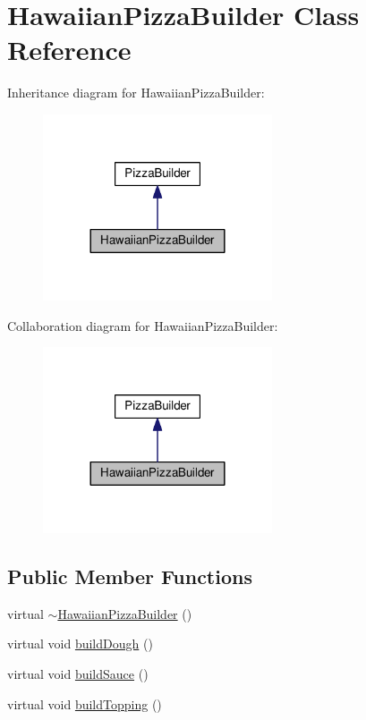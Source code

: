 \hypertarget{classHawaiianPizzaBuilder}{}\section{Hawaiian\+Pizza\+Builder Class Reference}
\label{classHawaiianPizzaBuilder}


Inheritance diagram for Hawaiian\+Pizza\+Builder\+:\nopagebreak
\begin{figure}[H]
\begin{center}
\leavevmode
\includegraphics[width=192pt]{classHawaiianPizzaBuilder__inherit__graph}
\end{center}
\end{figure}


Collaboration diagram for Hawaiian\+Pizza\+Builder\+:\nopagebreak
\begin{figure}[H]
\begin{center}
\leavevmode
\includegraphics[width=192pt]{classHawaiianPizzaBuilder__coll__graph}
\end{center}
\end{figure}
\subsection*{Public Member Functions}
\begin{DoxyCompactItemize}
\item 
virtual \hyperlink{classHawaiianPizzaBuilder_a621c6b7e508a206a5f85cea4e73fe747}{$\sim$\+Hawaiian\+Pizza\+Builder} ()
\item 
virtual void \hyperlink{classHawaiianPizzaBuilder_a0eddc6f115d76c24a9adfb86dc31a7cc}{build\+Dough} ()
\item 
virtual void \hyperlink{classHawaiianPizzaBuilder_abcfc366ad0ffcec8e93e19807b8eef18}{build\+Sauce} ()
\item 
virtual void \hyperlink{classHawaiianPizzaBuilder_af069af5d54a18d099a6ea6a4382fb42b}{build\+Topping} ()
\end{DoxyCompactItemize}
